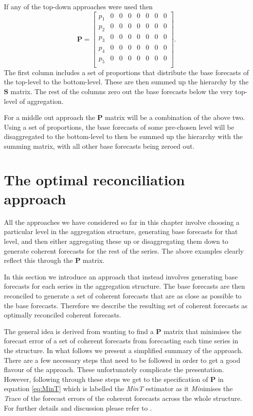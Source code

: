 \documentclass[]{book}
\begin{document}
If any of the top-down approaches were used then \[\bm{P}=
  \begin{bmatrix}
    p_1 & 0 & 0 & 0 & 0 & 0 & 0 & 0\\
    p_2 & 0 & 0 & 0 & 0 & 0 & 0 & 0\\
    p_3 & 0 & 0 & 0 & 0 & 0 & 0 & 0\\
    p_4 & 0 & 0 & 0 & 0 & 0 & 0 & 0\\
    p_5 & 0 & 0 & 0 & 0 & 0 & 0 & 0\\
  \end{bmatrix}.
  \]
The first column includes a set of proportions that distribute the base forecasts of the top-level to the bottom-level. These are then summed up the hierarchy by the \(\bm{S}\) matrix. The rest of the columns zero out the base forecasts below the very top-level of aggregation.

For a middle out approach the \(\bm{P}\) matrix will be a combination of the above two. Using a set of proportions, the base forecasts of some pre-chosen level will be disaggregated to the bottom-level to then be summed up the hierarchy with the summing matrix, with all other base forecasts being zeroed out.

\hypertarget{Hier:reconciliation}{%
\section{The optimal reconciliation approach}\label{Hier:reconciliation}}

All the approaches we have considered so far in this chapter involve choosing a particular level in the aggregation structure, generating base forecasts for that level, and then either aggregating these up or disaggregating them down to generate coherent forecasts for the rest of the series. The above examples clearly reflect this through the \(\bm{P}\) matrix.

In this section we introduce an approach that instead involves generating base forecasts for each series in the aggregation structure. The base forecasts are then reconciled to generate a set of coherent forecasts that are as close as possible to the base forecasts. Therefore we describe the resulting set of coherent forecasts as optimally reconciled coherent forecasts.

The general idea is derived from wanting to find a \(\bm{P}\) matrix that minimises the forecast error of a set of coherent forecasts from forecasting each time series in the structure. In what follows we present a simplified summary of the approach. There are a few necessary steps that need to be followed in order to get a good flavour of the approach. These unfortunately complicate the presentation. However, following through these steps we get to the specification of \(\bm{P}\) in equation \eqref{eq:MinT} which is labelled the \emph{MinT} estimator as it \emph{Min}imises the \emph{T}race of the forecast errors of the coherent forecasts across the whole structure. For further details and discussion please refer to \citet{Mint}.
\end{document}
